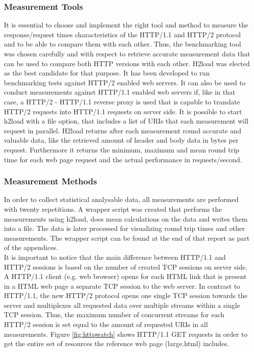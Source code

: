 \subsubsection{Measurement Tools}
It is essential to choose and implement the right tool and method to measure the response/request times characteristics of the HTTP/1.1 and HTTP/2 protocol and to be able to compare them with each other. Thus, the benchmarking tool was chosen carefully and with respect to retrieve accurate measurement data that can be used to compare both HTTP versions with each other. 
H2load \cite{h2load} was elected as the best candidate for that purpose. It has been developed to run benchmarking tests against HTTP/2 enabled web servers. 
It can also be used to conduct measurements against HTTP/1.1 enabled web servers if, like in that case, a HTTP/2 - HTTP/1.1 reverse proxy is used that is capable to translate HTTP/2 requests into HTTP/1.1 requests on server side. 
It is possible to start h2load with a file option, that includes a list of URIs that each measurement will request in parallel. H2load returns after each measurement round accurate and valuable data, like the retrieved  amount of header and body data in bytes per request. Furthermore it returns the minimum, maximum and mean round trip time for each web page request and the actual performance in requests/second. 
\\
\subsubsection{Measurement Methods}
In order to collect statistical analysable data, all measurements are performed with twenty repetitions. A wrapper script was created that performs the measurements using h2load, does mean calculations on the data and writes them into a file. The data is later processed for visualizing round trip times and other measurements. The wrapper script can be found at the end of that report as part of the appendices. 
\\
It is important to notice that the main difference between HTTP/1.1 and HTTP/2 sessions is based on the number of created TCP sessions on server side. A HTTP/1.1 client (e.g. web browser) opens for each HTML link that is present in a HTML web page a separate TCP session to the web server. In contrast to HTTP/1.1, the new HTTP/2 protocol opens one single TCP session towards the server and multiplexes all requested data over multiple streams within a single TCP session. Thus, the maximum number of concurrent streams for each HTTP/2 session is set equal to the amount of requested URIs in all measurements. Figure \ref{fig:httpwatch} shows HTTP/1.1 GET requests in order to get the entire set of resources the reference web page (large.html) includes.

